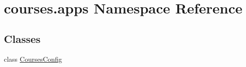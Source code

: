 \hypertarget{namespacecourses_1_1apps}{}\section{courses.\+apps Namespace Reference}
\label{namespacecourses_1_1apps}
\subsection*{Classes}
\begin{DoxyCompactItemize}
\item 
class \hyperlink{classcourses_1_1apps_1_1CoursesConfig}{Courses\+Config}
\end{DoxyCompactItemize}
